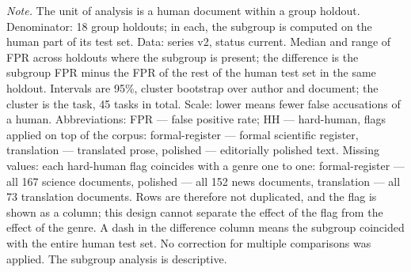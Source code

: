 \begin{table}[htbp]
\begin{minipage}{\linewidth}
\textit{Note.} The unit of analysis is a human document within a group holdout. Denominator: 18 group holdouts; in each, the subgroup is computed on the human part of its test set. Data: series v2, status current. Median and range of FPR across holdouts where the subgroup is present; the difference is the subgroup FPR minus the FPR of the rest of the human test set in the same holdout. Intervals are 95\%, cluster bootstrap over author and document; the cluster is the task, 45 tasks in total. Scale: lower means fewer false accusations of a human. Abbreviations: FPR — false positive rate; HH — hard-human, flags applied on top of the corpus: formal-register — formal scientific register, translation — translated prose, polished — editorially polished text. Missing values: each hard-human flag coincides with a genre one to one: formal-register — all 167 science documents, polished — all 152 news documents, translation — all 73 translation documents. Rows are therefore not duplicated, and the flag is shown as a column; this design cannot separate the effect of the flag from the effect of the genre. A dash in the difference column means the subgroup coincided with the entire human test set. No correction for multiple comparisons was applied. The subgroup analysis is descriptive.
\end{minipage}
\end{table}
